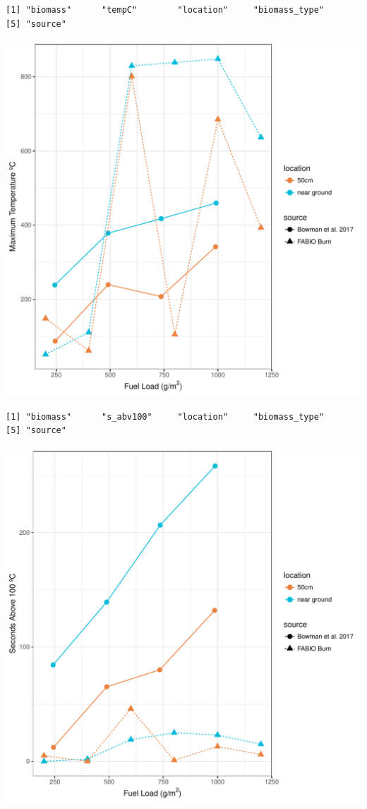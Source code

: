 \documentclass[11pt,a4paper]{article}
\begin{document}
\begin{verbatim}
[1] "biomass"      "tempC"        "location"     "biomass_type"
[5] "source"      
\end{verbatim}

\includegraphics{figures/compare_maxtemp-1.pdf}

\begin{verbatim}
[1] "biomass"      "s_abv100"     "location"     "biomass_type"
[5] "source"      
\end{verbatim}

\includegraphics{figures/compare_sAbv100-1.pdf}
\end{document}
